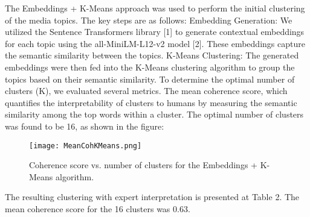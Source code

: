 The Embeddings + K-Means approach was used to perform the initial clustering of the media topics. The key steps are as follows:
Embedding Generation: We utilized the Sentence Transformers library [1] to generate contextual embeddings for each topic using the all-MiniLM-L12-v2 model [2]. These embeddings capture the semantic similarity between the topics.
K-Means Clustering: The generated embeddings were then fed into the K-Means clustering algorithm to group the topics based on their semantic similarity.
To determine the optimal number of clusters (K), we evaluated several metrics. The mean coherence score, which quantifies the interpretability of clusters to humans by measuring the semantic similarity among the top words within a cluster. The optimal number of clusters was found to be 16, as shown in the figure:

\begin{figure}[h] %
    \centering
    \texttt{[image: MeanCohKMeans.png]}
    \label{fig:MeanCohKMeans}
    \caption{Coherence score vs. number of clusters for the Embeddings + K-Means algorithm.}
\end{figure}

The resulting clustering with expert interpretation is presented at Table 2. The mean coherence score for the 16 clusters was 0.63.

